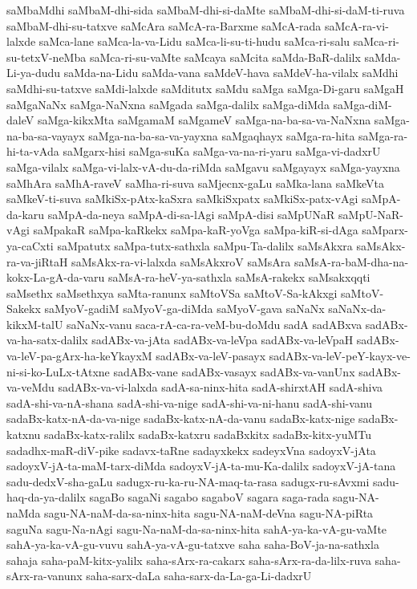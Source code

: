{saMbaMdhi
saMbaM-dhi-sida
saMbaM-dhi-si-daMte
saMbaM-dhi-si-daM-ti-ruva
saMbaM-dhi-su-tatxve
saMcAra
saMcA-ra-Barxme
saMcA-rada
saMcA-ra-vi-lalxde
saMca-lane
saMca-la-va-Lidu
saMca-li-su-ti-hudu
saMca-ri-salu
saMca-ri-su-tetxV-neMba
saMca-ri-su-vaMte
saMcaya
saMcita
saMda-BaR-dalilx
saMda-Li-ya-dudu
saMda-na-Lidu
saMda-vana
saMdeV-hava
saMdeV-ha-vilalx
saMdhi
saMdhi-su-tatxve
saMdi-lalxde
saMditutx
saMdu
saMga
saMga-Di-garu
saMgaH
saMgaNaNx
saMga-NaNxna
saMgada
saMga-dalilx
saMga-diMda
saMga-diM-daleV
saMga-kikxMta
saMgamaM
saMgameV
saMga-na-ba-sa-va-NaNxna
saMga-na-ba-sa-vayayx
saMga-na-ba-sa-va-yayxna
saMgaqhayx
saMga-ra-hita
saMga-ra-hi-ta-vAda
saMgarx-hisi
saMga-suKa
saMga-va-na-ri-yaru
saMga-vi-dadxrU
saMga-vilalx
saMga-vi-lalx-vA-du-da-riMda
saMgavu
saMgayayx
saMga-yayxna
saMhAra
saMhA-raveV
saMha-ri-suva
saMjecnx-gaLu
saMka-lana
saMkeVta
saMkeV-ti-suva
saMkiSx-pAtx-kaSxra
saMkiSxpatx
saMkiSx-patx-vAgi
saMpA-da-karu
saMpA-da-neya
saMpA-di-sa-lAgi
saMpA-disi
saMpUNaR
saMpU-NaR-vAgi
saMpakaR
saMpa-kaRkekx
saMpa-kaR-yoVga
saMpa-kiR-si-dAga
saMparx-ya-caCxti
saMpatutx
saMpa-tutx-sathxla
saMpu-Ta-dalilx
saMsAkxra
saMsAkx-ra-va-jiRtaH
saMsAkx-ra-vi-lalxda
saMsAkxroV
saMsAra
saMsA-ra-baM-dha-na-kokx-La-gA-da-varu
saMsA-ra-heV-ya-sathxla
saMsA-rakekx
saMsakxqqti
saMsethx
saMsethxya
saMta-ranunx
saMtoVSa
saMtoV-Sa-kAkxgi
saMtoV-Sakekx
saMyoV-gadiM
saMyoV-ga-diMda
saMyoV-gava
saNaNx
saNaNx-da-kikxM-talU
saNaNx-vanu
saca-rA-ca-ra-veM-bu-doMdu
sadA
sadABxva
sadABx-va-ha-satx-dalilx
sadABx-va-jAta
sadABx-va-leVpa
sadABx-va-leVpaH
sadABx-va-leV-pa-gArx-ha-keYkayxM
sadABx-va-leV-pasayx
sadABx-va-leV-peY-kayx-ve-ni-si-ko-LuLx-tAtxne
sadABx-vane
sadABx-vasayx
sadABx-va-vanUnx
sadABx-va-veMdu
sadABx-va-vi-lalxda
sadA-sa-ninx-hita
sadA-shirxtAH
sadA-shiva
sadA-shi-va-nA-shana
sadA-shi-va-nige
sadA-shi-va-ni-hanu
sadA-shi-vanu
sadaBx-katx-nA-da-va-nige
sadaBx-katx-nA-da-vanu
sadaBx-katx-nige
sadaBx-katxnu
sadaBx-katx-ralilx
sadaBx-katxru
sadaBxkitx
sadaBx-kitx-yuMTu
sadadhx-maR-diV-pike
sadavx-taRne
sadayxkekx
sadeyxVna
sadoyxV-jAta
sadoyxV-jA-ta-maM-tarx-diMda
sadoyxV-jA-ta-mu-Ka-dalilx
sadoyxV-jA-tana
sadu-dedxV-sha-gaLu
sadugx-ru-ka-ru-NA-maq-ta-rasa
sadugx-ru-sAvxmi
sadu-haq-da-ya-dalilx
sagaBo
sagaNi
sagabo
sagaboV
sagara
saga-rada
sagu-NA-naMda
sagu-NA-naM-da-sa-ninx-hita
sagu-NA-naM-deVna
sagu-NA-piRta
saguNa
sagu-Na-nAgi
sagu-Na-naM-da-sa-ninx-hita
sahA-ya-ka-vA-gu-vaMte
sahA-ya-ka-vA-gu-vuvu
sahA-ya-vA-gu-tatxve
saha
saha-BoV-ja-na-sathxla
sahaja
saha-paM-kitx-yalilx
saha-sArx-ra-cakarx
saha-sArx-ra-da-lilx-ruva
saha-sArx-ra-vanunx
saha-sarx-daLa
saha-sarx-da-La-ga-Li-dadxrU
}
